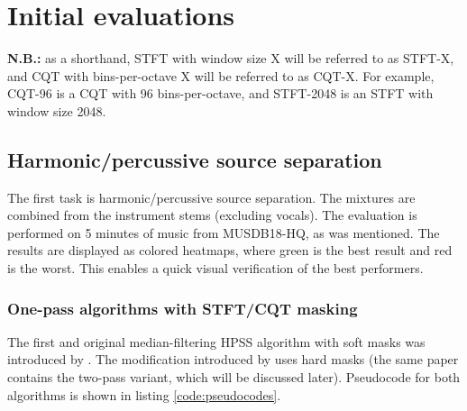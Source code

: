 \documentclass[letter,12pt]{article}
\begin{document}
\section{Initial evaluations}
\label{sec:elim}

\textbf{N.B.:} as a shorthand, STFT with window size X will be referred to as STFT-X, and CQT with bins-per-octave X will be referred to as CQT-X. For example, CQT-96 is a CQT with 96 bins-per-octave, and STFT-2048 is an STFT with window size 2048.

\subsection{Harmonic/percussive source separation}

The first task is harmonic/percussive source separation. The mixtures are combined from the instrument stems (excluding vocals). The evaluation is performed on 5 minutes of music from MUSDB18-HQ, as was mentioned. The results are displayed as colored heatmaps, where green is the best result and red is the worst. This enables a quick visual verification of the best performers.

\subsubsection{One-pass algorithms with STFT/CQT masking}

The first and original median-filtering HPSS algorithm with soft masks was introduced by \citet{fitzgerald1}. The modification introduced by \citet{driedger} uses hard masks (the same paper contains the two-pass variant, which will be discussed later). Pseudocode for both algorithms is shown in listing \ref{code:pseudocodes}.
\end{document}
